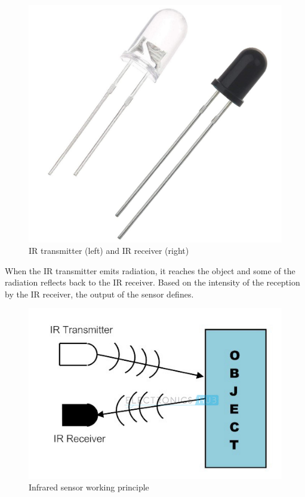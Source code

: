 \documentclass[13pt,a4paper,twoside]{report}
\begin{document}
\begin{figure}[H]
\centering
\includegraphics[scale=0.09]{images/ir_trans_recev.jpg}
\caption{IR transmitter (left) and IR receiver (right)}
\end{figure}

When the IR transmitter emits radiation, it reaches the object and some of the radiation reflects back to the IR receiver. Based on the intensity of the reception by the IR receiver, the output of the sensor defines.
\begin{figure}[H]
\centering
\includegraphics[scale=0.7]{images/ir_principle.jpg}
\caption{Infrared sensor working principle\protect\footnotemark}
\end{figure}
\end{document}
